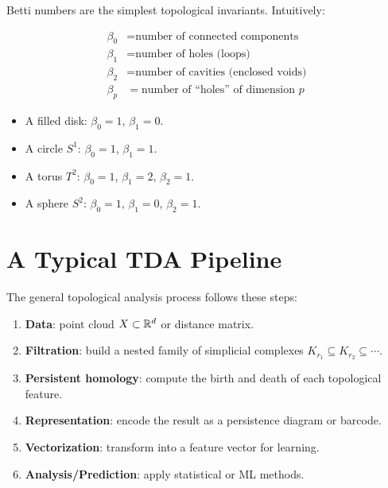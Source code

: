 Betti numbers are the simplest topological invariants. Intuitively:

\begin{keyformulas}[title=\textbf{Betti Numbers}]
\begin{align}
\beta_0 &= \text{number of connected components} \\
\beta_1 &= \text{number of holes (loops)} \\
\beta_2 &= \text{number of cavities (enclosed voids)} \\
\beta_p &= \text{number of ``holes'' of dimension } p
\end{align}
\end{keyformulas}

\begin{example}
\begin{itemize}
  \item A filled disk: $\beta_0 = 1$, $\beta_1 = 0$.
  \item A circle $S^1$: $\beta_0 = 1$, $\beta_1 = 1$.
  \item A torus $T^2$: $\beta_0 = 1$, $\beta_1 = 2$, $\beta_2 = 1$.
  \item A sphere $S^2$: $\beta_0 = 1$, $\beta_1 = 0$, $\beta_2 = 1$.
\end{itemize}
\end{example}

\section{A Typical TDA Pipeline}

The general topological analysis process follows these steps:

\begin{algorithme}[title=\textbf{Standard TDA Pipeline}]
\begin{enumerate}
  \item \textbf{Data}: point cloud $X \subset \mathbb{R}^d$ or distance matrix.
  \item \textbf{Filtration}: build a nested family of simplicial
        complexes $K_{r_1} \subseteq K_{r_2} \subseteq \cdots$.
  \item \textbf{Persistent homology}: compute the birth and death of
        each topological feature.
  \item \textbf{Representation}: encode the result as a persistence
        diagram or barcode.
  \item \textbf{Vectorization}: transform into a feature vector for
        learning.
  \item \textbf{Analysis/Prediction}: apply statistical or ML methods.
\end{enumerate}
\end{algorithme}

